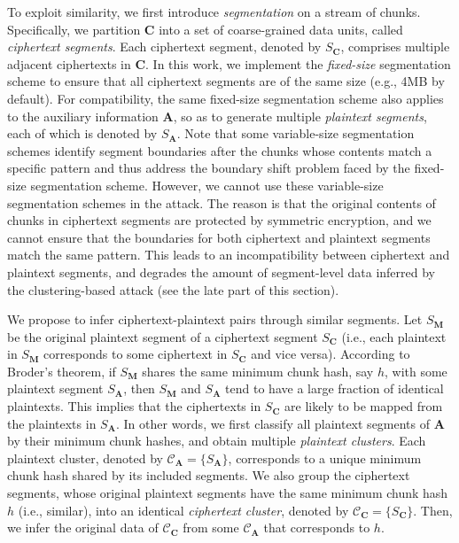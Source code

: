 To exploit similarity, we first introduce {\em segmentation} on a stream of chunks. Specifically, we partition $\mathbf{C}$ into a set of coarse-grained data units, called {\em ciphertext segments}. Each ciphertext segment, denoted by $S_\mathbf{C}$, comprises multiple adjacent ciphertexts in $\mathbf{C}$. In this work, we implement the {\em fixed-size} segmentation scheme to ensure that all ciphertext segments are of the same size (e.g., 4MB by default). For compatibility, the same fixed-size segmentation scheme also applies to the auxiliary information $\mathbf{A}$, so as to generate multiple {\em plaintext segments}, each of which is denoted by $S_\mathbf{A}$. Note that some variable-size segmentation schemes \cite{lillibridge09, qin17}  identify segment boundaries after the chunks whose contents match a specific pattern and thus address the boundary shift problem faced by the fixed-size segmentation scheme. However, we cannot use these variable-size segmentation schemes \cite{lillibridge09, qin17} in the attack. The reason is that the original contents of chunks in ciphertext segments are protected by symmetric encryption, and we cannot ensure that the boundaries for both ciphertext and plaintext segments match the same pattern. This leads to an incompatibility between ciphertext and plaintext segments, and degrades the amount of segment-level data inferred by the clustering-based attack (see the late part of this section).    

We propose to infer ciphertext-plaintext pairs through similar segments. Let $S_\mathbf{M}$ be the original plaintext segment of a ciphertext segment $S_\mathbf{C}$ (i.e., each plaintext in $S_\mathbf{M}$ corresponds to some ciphertext in $S_\mathbf{C}$ and vice versa). According to Broder's theorem, if $S_\mathbf{M}$ shares the same minimum chunk hash, say $h$, with some plaintext segment $S_\mathbf{A}$, then $S_\mathbf{M}$  and $S_\mathbf{A}$ tend to have a large fraction of identical plaintexts. This implies that the ciphertexts in $S_\mathbf{C}$ are likely to be mapped from the plaintexts in  $S_\mathbf{A}$. In other words, we first classify all plaintext segments of $\mathbf{A}$ by their minimum chunk hashes, and obtain multiple {\em plaintext clusters}. Each plaintext cluster, denoted by $\mathcal{C}_\mathbf{A} = \{ S_\mathbf{A} \}$, corresponds to a unique minimum chunk hash shared by its included segments. We also group the ciphertext segments, whose original plaintext segments have the same minimum chunk hash $h$ (i.e., similar), into an identical {\em ciphertext cluster}, denoted by $\mathcal{C}_\mathbf{C} = \{ S_\mathbf{C} \}$. Then, we infer the original data of $\mathcal{C}_\mathbf{C}$ from some $\mathcal{C}_\mathbf{A}$ that corresponds to  $h$.    

